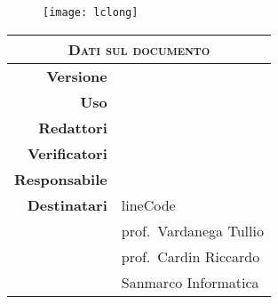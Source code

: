 \title{\huge \textsc{\phTitle{}} \\
	\vspace{11pt} \large \textsc{\phDate{}}}

\author{} %
\date{} %


\begin{figure}[t!]
	\centering
	\texttt{[image: lclong]}
\end{figure}

\maketitle
\thispagestyle{empty}

\begin{table}[ht]
	\begin{center}
		\label{tab:Dati sul documento}
		\begin{tabular}{r|l}
			\multicolumn{2}{c}{ \textsc{Dati sul documento} } \\
			\hline
			\textbf{Versione} & \versione{} \\
			\textbf{Uso} & \uso{}  \\
			\textbf{Redattori} & \redattori{} \\
			\textbf{Verificatori} & \verificatori{} \\
			\textbf{Responsabile} & \responsabile{} \\
			\textbf{Destinatari} & lineCode \\
								& prof.\ Vardanega Tullio \\		
								& prof.\ Cardin Riccardo \\
			\ifthenelse{\equal{\uso}{Esterno}}{
								& Sanmarco Informatica
			}{} \\
		\end{tabular}
	\end{center}
\end{table}

\newpage